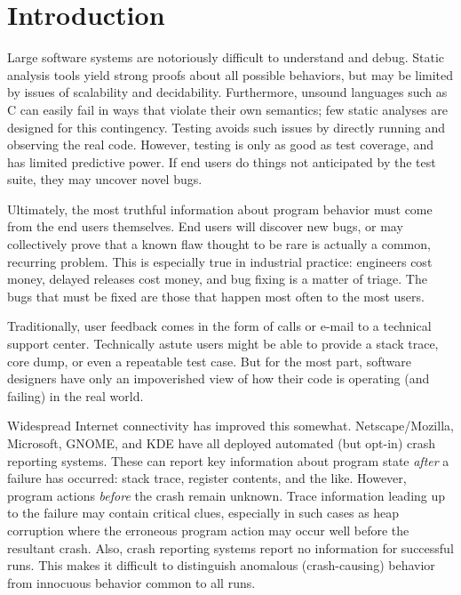 \section{Introduction}

Large software systems are notoriously difficult to understand and
debug.  Static analysis tools yield strong proofs about all possible
behaviors, but may be limited by issues of scalability and
decidability.  Furthermore, unsound languages such as C can easily
fail in ways that violate their own semantics; few static analyses are
designed for this contingency.  Testing avoids such issues by directly
running and observing the real code.  However, testing is only as good
as test coverage, and has limited predictive power.  If end users do
things not anticipated by the test suite, they may uncover novel bugs.

Ultimately, the most truthful information about program behavior must
come from the end users themselves.  End users will discover new bugs,
or may collectively prove that a known flaw thought to be rare is
actually a common, recurring problem.  This is especially true in
industrial practice: engineers cost money, delayed releases cost
money, and bug fixing is a matter of triage.  The bugs that must be
fixed are those that happen most often to the most users.

Traditionally, user feedback comes in the form of calls or e-mail to a
technical support center.  Technically astute users might be able to
provide a stack trace, core dump, or even a repeatable test case.  But
for the most part, software designers have only an impoverished view
of how their code is operating (and failing) in the real world.

Widespread Internet connectivity has improved this somewhat.
Netscape/Mozilla, Microsoft, GNOME, and KDE have all deployed
automated (but opt-in) crash reporting systems.  These can report key
information about program state \emph{after} a failure has occurred:
stack trace, register contents, and the like.  However, program
actions \emph{before} the crash remain unknown.  Trace information
leading up to the failure may contain critical clues, especially in
such cases as heap corruption where the erroneous program action may
occur well before the resultant crash.  Also, crash reporting systems
report no information for successful runs.  This makes it difficult to
distinguish anomalous (crash-causing) behavior from innocuous behavior
common to all runs.


